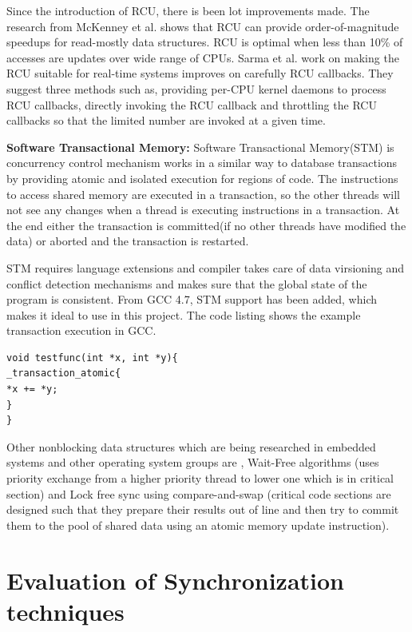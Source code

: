 Since the introduction of RCU, there is been lot improvements made. The research from McKenney et al. shows that RCU can provide order-of-magnitude speedups for read-mostly data structures. RCU is optimal when less than 10\% of accesses are updates over wide range of CPUs. Sarma et al. \cite{sarma2004making} work on making the RCU suitable for real-time systems improves on carefully RCU callbacks. They suggest three methods such as,  providing per-CPU kernel daemons to process RCU callbacks, directly invoking the RCU callback and throttling the RCU callbacks so that the limited number are invoked at a given time.

\textbf{Software Transactional Memory:}
Software Transactional Memory(STM) is concurrency control mechanism works in a similar way to database transactions by providing atomic and isolated execution for regions of code. The instructions to access shared memory are executed in a transaction, so the other threads will not see any changes when a thread is executing instructions in a transaction. At the end either the transaction is committed(if no other threads have modified the data) or aborted and the transaction is restarted. 

STM requires language extensions and compiler takes care of data virsioning  and conflict detection mechanisms and makes sure that the global state of the program is consistent. From GCC 4.7, STM support has been added, which makes it ideal to use in this project. The code listing shows the example transaction execution in GCC.


\begin{lstlisting}[caption={STM example code in GCC},label=sysdeploycode, style=customcpp]
void testfunc(int *x, int *y){
_transaction_atomic{
*x += *y;
}
}
\end{lstlisting}

Other nonblocking data structures which are being researched in embedded systems and other operating system groups are \cite{hohmuth2001pragmatic}, Wait-Free algorithms (uses priority exchange from a higher priority thread to lower one which is in critical section) and Lock free sync using compare-and-swap (critical code sections are designed such that they prepare their results out of line and then try to commit them to the pool of shared data using an atomic memory update instruction).


\section{Evaluation of Synchronization techniques}

